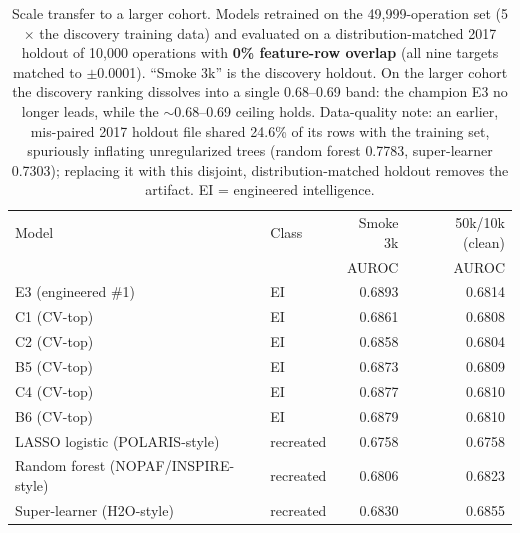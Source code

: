 \begin{table}[ht]
\centering
\small
\caption{Scale transfer to a larger cohort. Models retrained on the 49,999-operation set (5$\times$ the discovery training data) and evaluated on a distribution-matched 2017 holdout of 10,000 operations with \textbf{0\% feature-row overlap} (all nine targets matched to $\pm$0.0001). ``Smoke 3k'' is the discovery holdout. On the larger cohort the discovery ranking dissolves into a single 0.68--0.69 band: the champion E3 no longer leads, while the $\sim$0.68--0.69 ceiling holds. Data-quality note: an earlier, mis-paired 2017 holdout file shared 24.6\% of its rows with the training set, spuriously inflating unregularized trees (random forest 0.7783, super-learner 0.7303); replacing it with this disjoint, distribution-matched holdout removes the artifact. EI = engineered intelligence.}
\label{tab:temporal}
\begin{tabular}{llrr}
\toprule
Model & Class & Smoke 3k & 50k/10k (clean) \\
 & & AUROC & AUROC \\
\midrule
E3 (engineered \#1) & EI & 0.6893 & 0.6814 \\
C1 (CV-top) & EI & 0.6861 & 0.6808 \\
C2 (CV-top) & EI & 0.6858 & 0.6804 \\
B5 (CV-top) & EI & 0.6873 & 0.6809 \\
C4 (CV-top) & EI & 0.6877 & 0.6810 \\
B6 (CV-top) & EI & 0.6879 & 0.6810 \\
LASSO logistic (POLARIS-style) & recreated & 0.6758 & 0.6758 \\
Random forest (NOPAF/INSPIRE-style) & recreated & 0.6806 & 0.6823 \\
Super-learner (H2O-style) & recreated & 0.6830 & 0.6855 \\
\bottomrule
\end{tabular}
\end{table}
